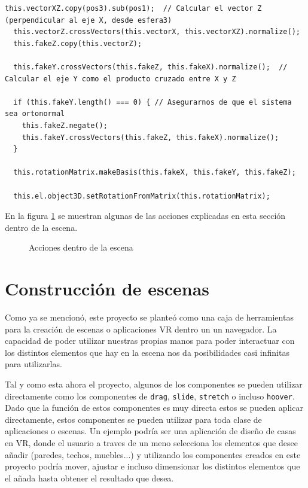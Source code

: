 \documentclass[a4paper, 12pt]{book}
\begin{document}
\begin{itemize}
\begin{lstlisting}[caption=Creación del falso eje de coordenadas, captionpos=b, label=lst:fake_coords]
  this.vectorXZ.copy(pos3).sub(pos1);  // Calcular el vector Z (perpendicular al eje X, desde esfera3)
  this.vectorZ.crossVectors(this.vectorX, this.vectorXZ).normalize();
  this.fakeZ.copy(this.vectorZ);

  this.fakeY.crossVectors(this.fakeZ, this.fakeX).normalize();  // Calcular el eje Y como el producto cruzado entre X y Z
  
  if (this.fakeY.length() === 0) { // Asegurarnos de que el sistema sea ortonormal
    this.fakeZ.negate();
    this.fakeY.crossVectors(this.fakeZ, this.fakeX).normalize();
  }
  
  this.rotationMatrix.makeBasis(this.fakeX, this.fakeY, this.fakeZ);
  
  this.el.object3D.setRotationFromMatrix(this.rotationMatrix); 
\end{lstlisting}
\end{itemize}

En la figura \ref{fig:mosaico} se muestran algunas de las acciones explicadas en esta sección dentro de la escena.
\begin{figure}[H] 
  \centering
  \fbox{\rule{0pt}{150pt} \rule{0.7\textwidth}{0pt}} 
  \caption{Acciones dentro de la escena}
  \label{fig:mosaico}
\end{figure}

\section{Construcción de escenas}
\label{sec:escenas}

Como ya se mencionó, este proyecto se planteó como una caja de herramientas para la creación de escenas o aplicaciones VR dentro un un navegador. La capacidad de poder utilizar nuestras propias manos para poder interactuar con los distintos elementos que hay en la escena nos da posibilidades casi infinitas para utilizarlas. 

Tal y como esta ahora el proyecto, algunos de los componentes se pueden utilizar directamente como los componentes de \texttt{drag}, \texttt{slide}, \texttt{stretch} o incluso \texttt{hoover}. Dado que la función de estos componentes es muy directa estos se pueden aplicar directamente, estos componentes se pueden utilizar para toda clase de aplicaciones o escenas. Un ejemplo podría ser una aplicación de diseño de casas en VR,
donde el usuario a traves de un meno selecciona los elementos que desee añadir (paredes, techos, muebles...) y utilizando los componentes creados en este proyecto podría mover, ajustar e incluso dimensionar los distintos elementos que el añada hasta obtener el resultado que desea. 
\end{document}
